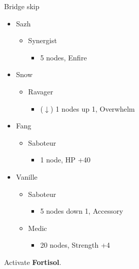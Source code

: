 	Bridge skip
	
	\begin{menu}
		\begin{itemize}
			\crystarium
			\begin{itemize}
				\item Sazh
				      \begin{itemize}
					      \item Synergist
					            \begin{itemize}
						            \item 5 nodes, Enfire
					            \end{itemize}
				      \end{itemize}
				\item Snow
				      \begin{itemize}
					      \item Ravager
					            \begin{itemize}
						            \item ($\downarrow$) 1 nodes up 1, Overwhelm
					            \end{itemize}
				      \end{itemize}
				\item Fang
				      \begin{itemize}
					      \item Saboteur
					            \begin{itemize}
						            \item 1 node, HP +40
					            \end{itemize}
				      \end{itemize}
				\item Vanille
				      \begin{itemize}
					      \item Saboteur
					            \begin{itemize}
						            \item 5 nodes down 1, Accessory
					            \end{itemize}
					      \item Medic
					            \begin{itemize}
						            \item 20 nodes, Strength +4
					            \end{itemize}
				      \end{itemize}
			\end{itemize}

		\end{itemize}
	\end{menu}
	 Activate \textbf{Fortisol}.
	\vfill

